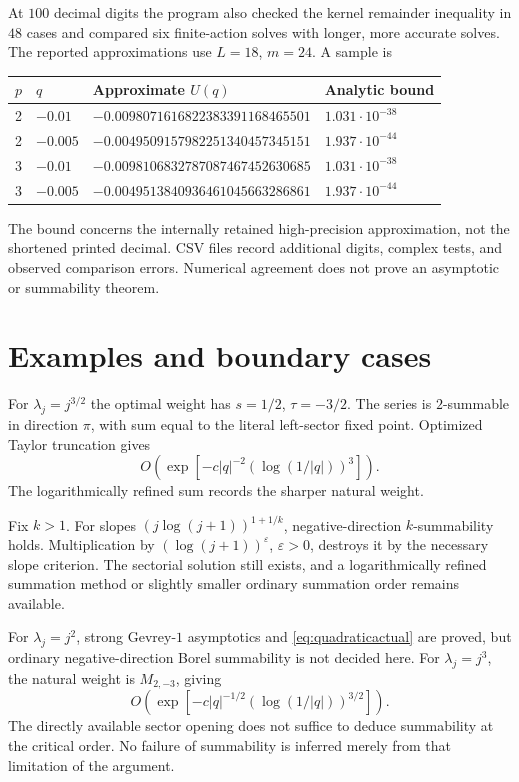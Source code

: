 \documentclass[11pt,a4paper]{article}
\numberwithin{equation}{section}
\theoremstyle{definition}\newtheorem{definition}[theorem]{Definition}
\theoremstyle{remark}\newtheorem{remark}[theorem]{Remark}
\begin{document}
At $100$ decimal digits the program also checked the kernel remainder
inequality in $48$ cases and compared six finite-action solves with
longer, more accurate solves. The reported approximations use $L=18$,
$m=24$. A sample is
\begin{center}\small
\begin{tabular}{@{}clll@{}}\toprule
$p$ & $q$ & Approximate $U(q)$ & Analytic bound\\\midrule
2 & $-0.01$ & $-0.0098071616822383391168465501$ & $1.031\cdot10^{-38}$\\
2 & $-0.005$ & $-0.0049509157982251340457345151$ & $1.937\cdot10^{-44}$\\
3 & $-0.01$ & $-0.0098106832787087467452630685$ & $1.031\cdot10^{-38}$\\
3 & $-0.005$ & $-0.0049513840936461045663286861$ & $1.937\cdot10^{-44}$\\
\bottomrule\end{tabular}
\end{center}
The bound concerns the internally retained high-precision approximation,
not the shortened printed decimal. CSV files record additional digits,
complex tests, and observed comparison errors. Numerical agreement does
not prove an asymptotic or summability theorem.

\section{Examples and boundary cases}
\label{sec:examples}
For $\lambda_j=j^{3/2}$ the optimal weight has $s=1/2$, $\tau=-3/2$.
The series is $2$-summable in direction $\pi$, with sum equal to the
literal left-sector fixed point. Optimized Taylor truncation gives
\[
 O(\exp[-c|q|^{-2}(\log(1/|q|))^3]).
\]
The logarithmically refined sum records the sharper natural weight.

Fix $k>1$. For slopes $(j\log(j+1))^{1+1/k}$, negative-direction
$k$-summability holds. Multiplication by $(\log(j+1))^\varepsilon$,
$\varepsilon>0$, destroys it by the necessary slope criterion.
The sectorial solution still exists, and a logarithmically refined
summation method or slightly smaller ordinary summation order remains
available.

For $\lambda_j=j^2$, strong Gevrey-$1$ asymptotics and
\eqref{eq:quadraticactual} are proved, but ordinary negative-direction
Borel summability is not decided here. For $\lambda_j=j^3$, the
natural weight is $M_{2,-3}$, giving
\[
 O(\exp[-c|q|^{-1/2}(\log(1/|q|))^{3/2}]).
\]
The directly available sector opening does not suffice to deduce
summability at the critical order. No failure of summability is inferred
merely from that limitation of the argument.
\end{document}
